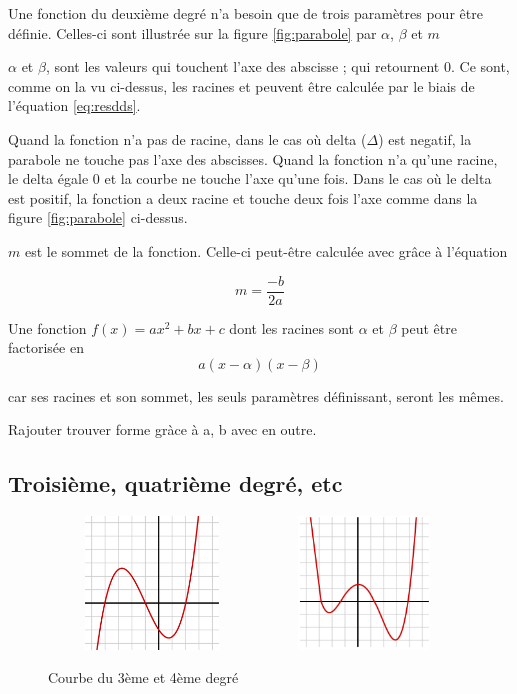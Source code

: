 \documentclass[a4paper]{article}
\begin{document}
    Une fonction du deuxième degré n'a besoin que de trois paramètres pour
    être définie. Celles-ci sont illustrée sur la figure \ref{fig:parabole} par
    $\alpha $, $\beta $ et $m$

    $\alpha$ et $\beta$, sont les valeurs qui touchent l'axe des abscisse ; qui
    retournent $0$. Ce sont, comme on la vu ci-dessus, les racines et peuvent
    être calculée par le biais de l'équation \ref{eq:resdds}.
    
    Quand la fonction n'a pas de racine, dans le cas où delta ($\Delta$) est 
    negatif, la parabole ne touche pas l'axe des abscisses. Quand la fonction
    n'a qu'une racine, le delta égale $0$ et la courbe ne touche l'axe qu'une 
    fois. Dans le cas où le delta est positif, la fonction a deux racine et
    touche deux fois l'axe comme dans la figure \ref{fig:parabole} ci-dessus.

    $m$ est le sommet de la fonction. Celle-ci peut-être calculée avec grâce
    à l'équation 

    \begin{equation}
        m = \frac{-b}{2a}    
    \end{equation}

    Une fonction $f(x) = ax^{2}+bx+c$ dont les racines sont $\alpha$ et $\beta$
    peut être factorisée en 
    \begin{equation}\label{eq:ddfact}
    a(x - \alpha)(x - \beta)
    \end{equation}

    \noindent car ses racines et son sommet, les seuls paramètres définissant,
    seront les mêmes.

    Rajouter trouver forme gràce à a, b avec en outre.

    \subsection{Troisième, quatrième degré, etc}
    \begin{figure}[H]
        \centering
        \includegraphics[width=0.49\textwidth, height=100pt]{3d.png} 
        \includegraphics[width=0.49\textwidth, height=100pt]{4d.png} 
        \caption{Courbe du 3ème et 4ème degré}
        \label{fig:34d}
    \end{figure}
\end{document}
